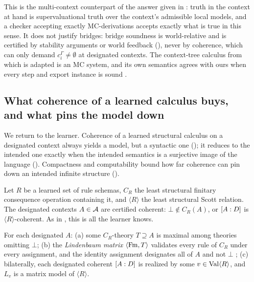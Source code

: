 This is the multi-context counterpart of the answer given in : truth in the context at hand is supervaluational truth over the context's admissible local models, and a checker accepting exactly MC-derivations accepts exactly what is true in this sense. It does not justify bridges: bridge soundness is world-relative and is certified by stability arguments or world feedback (), never by coherence, which can only demand $c^\Gamma_i\neq\emptyset$ at designated contexts. The context-tree calculus from which  is adapted is an MC system, and its own semantics agrees with ours when every step and export instance is sound .

\subsection{What coherence of a learned calculus buys, and what pins the model down}\label{sec:existence:learned}

We return to the learner. Coherence of a learned structural calculus on a designated context always yields a model, but a syntactic one (); it reduces to the intended one exactly when the intended semantics is a surjective image of the language (). Compactness and computability bound how far coherence can pin down an intended infinite structure ().

Let $R$ be a learned set of rule schemas, $C_R$ the least structural finitary consequence operation containing it, and $\langle R\rangle$ the least structural Scott relation. The designated contexts $A\in\mathcal{A}$ are certified coherent: $\bot\notin C_R(A)$, or $[A : D]$ is $\langle R\rangle$-coherent. As in , this is all the learner knows.

\begin{theorem}\label{thm:existence:buys}
For each designated $A$: \textup{(a)} some $C_R$-theory $T\supseteq A$ is maximal among theories omitting $\bot$; \textup{(b)} the \emph{Lindenbaum matrix} $\langle\mathrm{Fm},T\rangle$ validates every rule of $C_R$ under every assignment, and the identity assignment designates all of $A$ and not $\bot$ \citep{los1958remarks,wojcicki1988theory}; \textup{(c)} bilaterally, each designated coherent $[A : D]$ is realized by some $v\in\mathrm{Val}\langle R\rangle$, and $L_v$ is a matrix model of $\langle R\rangle$.
\end{theorem}

